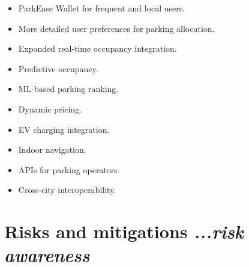 \documentclass[12pt,a4paper]{article}
\begin{document}
\begin{itemize}
    \item ParkEase Wallet for frequent and local users.

    \item More detailed user preferences for parking allocation.

    \item Expanded real-time occupancy integration.

    \item Predictive occupancy.

    \item ML-based parking ranking.

    \item Dynamic pricing.

    \item EV charging integration.

    \item Indoor navigation.

    \item APIs for parking operators.

    \item Cross-city interoperability.
\end{itemize}


\section{\textbf{Risks and mitigations}
\hfill
{\small\mdseries\itshape ...risk awareness}}
\end{document}
